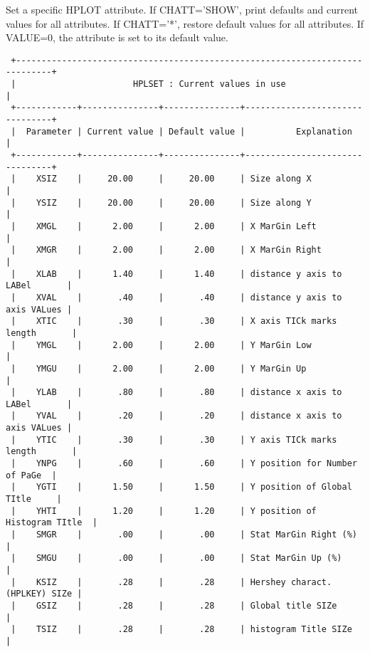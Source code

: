 \fi


\BEGARG
{}
\ENDARG

   \par
Set a specific HPLOT attribute.  If CHATT='SHOW', print defaults and 
   current values for all attributes.  If CHATT='*', restore default values 
   for all attributes.  If VALUE=0, the attribute is set to its default value. 

\begin{verbatim}
 +-----------------------------------------------------------------------------+
 |                       HPLSET : Current values in use                        |
 +------------+---------------+---------------+--------------------------------+
 |  Parameter | Current value | Default value |          Explanation           |
 +------------+---------------+---------------+--------------------------------+
 |    XSIZ    |     20.00     |     20.00     | Size along X                   |
 |    YSIZ    |     20.00     |     20.00     | Size along Y                   |
 |    XMGL    |      2.00     |      2.00     | X MarGin Left                  |
 |    XMGR    |      2.00     |      2.00     | X MarGin Right                 |
 |    XLAB    |      1.40     |      1.40     | distance y axis to LABel       |
 |    XVAL    |       .40     |       .40     | distance y axis to axis VALues |
 |    XTIC    |       .30     |       .30     | X axis TICk marks length       |
 |    YMGL    |      2.00     |      2.00     | Y MarGin Low                   |
 |    YMGU    |      2.00     |      2.00     | Y MarGin Up                    |
 |    YLAB    |       .80     |       .80     | distance x axis to LABel       |
 |    YVAL    |       .20     |       .20     | distance x axis to axis VALues |
 |    YTIC    |       .30     |       .30     | Y axis TICk marks length       |
 |    YNPG    |       .60     |       .60     | Y position for Number of PaGe  |
 |    YGTI    |      1.50     |      1.50     | Y position of Global TItle     |
 |    YHTI    |      1.20     |      1.20     | Y position of Histogram TItle  |
 |    SMGR    |       .00     |       .00     | Stat MarGin Right (%)          |
 |    SMGU    |       .00     |       .00     | Stat MarGin Up (%)             |
 |    KSIZ    |       .28     |       .28     | Hershey charact. (HPLKEY) SIZe |
 |    GSIZ    |       .28     |       .28     | Global title SIZe              |
 |    TSIZ    |       .28     |       .28     | histogram Title SIZe           |

\end{verbatim}
